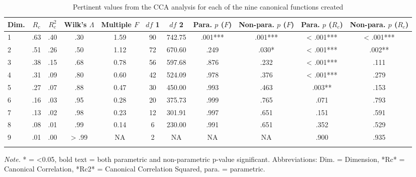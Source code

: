 \documentclass[
  english,
  man,floatsintext]{apa6}
\begin{document}
\begin{table}[tbp]

\begin{center}
\begin{threeparttable}

\caption{\label{tab:ccatable}Pertinent values from the CCA analysis for each of the nine canonical functions
          created}

\small{

\begin{tabular}{lcccccccccc}
\toprule
Dim. & $R_{c}$ & $R^{2}_{c}$ & Wilk’s $\Lambda$ & Multiple $F$ & $df$ 1 & $df$ 2 & Para. $p$ ($F$) & Non-para. $p$ ($F$) & Para. $p$ ($R_{c}$) & Non-para. $p$ ($R_{c}$)\\
\midrule
1 & .63 & .40 & .30 & 1.59 & 90 & 742.75 & .001*** & .001*** & < .001*** & < .001***\\
2 & .51 & .26 & .50 & 1.12 & 72 & 670.60 & .249 & .030* & < .001*** & .002**\\
3 & .38 & .15 & .68 & 0.78 & 56 & 597.68 & .876 & .232 & < .001*** & .111\\
4 & .31 & .09 & .80 & 0.60 & 42 & 524.09 & .978 & .376 & < .001*** & .279\\
5 & .27 & .07 & .88 & 0.47 & 30 & 450.00 & .993 & .463 & .003** & .153\\
6 & .16 & .03 & .95 & 0.28 & 20 & 375.73 & .999 & .765 & .071 & .793\\
7 & .13 & .02 & .98 & 0.23 & 12 & 301.91 & .997 & .651 & .151 & .591\\
8 & .08 & .01 & .99 & 0.14 & 6 & 230.00 & .991 & .651 & .352 & .529\\
9 & .01 & .00 & > .99 & NA & 2 & NA & NA & NA & .900 & .935\\
\bottomrule
\addlinespace
\end{tabular}

}

\begin{tablenotes}[para]
\normalsize{\textit{Note.} * = <0.05, bold text = both parametric and non-parametric p-value significant. Abbreviations: Dim. = Dimension, *Rc* = Canonical Correlation, *Rc2* = Canonical Correlation Squared, 
          para. = parametric.}
\end{tablenotes}

\end{threeparttable}
\end{center}

\end{table}
\end{document}
